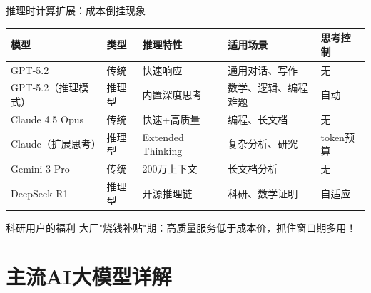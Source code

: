 \documentclass[aspectratio=169,11pt]{beamer}
\begin{document}
\begin{frame}{推理时计算扩展：成本倒挂现象}
    \vspace{0.2cm}
    \footnotesize
    \begin{tabular}{lllll}
        \toprule
        \textbf{模型} & \textbf{类型} & \textbf{推理特性} & \textbf{适用场景} & \textbf{思考控制} \\
        \midrule
        \rowcolor{blue!8} GPT-5.2 & 传统 & 快速响应 & 通用对话、写作 & 无 \\
        \rowcolor{orange!15} GPT-5.2（推理模式） & 推理型 & 内置深度思考 & 数学、逻辑、编程难题 & 自动 \\
        \rowcolor{blue!8} Claude 4.5 Opus & 传统 & 快速+高质量 & 编程、长文档 & 无 \\
        \rowcolor{orange!15} Claude（扩展思考） & 推理型 & Extended Thinking & 复杂分析、研究 & token预算 \\
        \rowcolor{blue!8} Gemini 3 Pro & 传统 & 200万上下文 & 长文档分析 & 无 \\
        \rowcolor{orange!15} DeepSeek R1 & 推理型 & 开源推理链 & 科研、数学证明 & 自适应 \\
        \bottomrule
    \end{tabular}
    
    \vspace{0.15cm}
    \begin{exampleblock}{科研用户的福利}
        大厂"烧钱补贴"期：高质量服务低于成本价，抓住窗口期多用！
    \end{exampleblock}
\end{frame}

\section{主流AI大模型详解}
\end{document}
